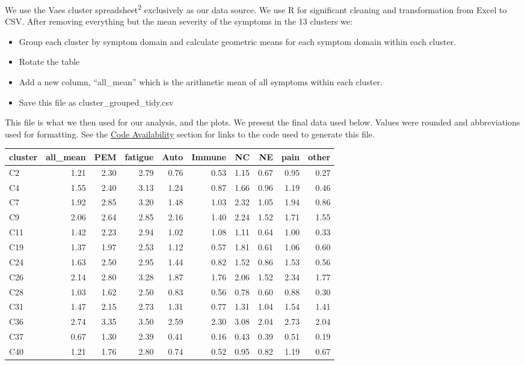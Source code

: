 \documentclass[
  letterpaper,
  DIV=11,
  numbers=noendperiod]{scrartcl}
\providecommand{\tightlist}{%
  \setlength{\itemsep}{0pt}\setlength{\parskip}{0pt}}
\begin{document}
We use the Vaes cluster spreadsheet\textsuperscript{2} exclusively as
our data source. We use R for significant cleaning and transformation
from Excel to CSV. After removing everything but the mean severity of
the symptoms in the 13 clusters we:

\begin{itemize}
\tightlist
\item
  Group each cluster by symptom domain and calculate geometric means for
  each symptom domain within each cluster.
\item
  Rotate the table
\item
  Add a new column, ``all\_mean'' which is the arithmetic mean of all
  symptoms within each cluster.
\item
  Save this file as cluster\_grouped\_tidy.csv
\end{itemize}

This file is what we then used for our analysis, and the plots. We
present the final data used below. Values were rounded and abbreviations
used for formatting. See the \hyperref[sec-code]{Code Availability}
section for links to the code used to generate this file.

\begin{table}
\fontsize{12.0pt}{14.4pt}\selectfont
\begin{tabular*}{\linewidth}{@{\extracolsep{\fill}}lrrrrrrrrr}
\toprule
cluster & all\_mean & PEM & fatigue & Auto & Immune & NC & NE & pain & other \\ 
\midrule\addlinespace[2.5pt]
C2 & 1.21 & 2.30 & 2.79 & 0.76 & 0.53 & 1.15 & 0.67 & 0.95 & 0.27 \\ 
C4 & 1.55 & 2.40 & 3.13 & 1.24 & 0.87 & 1.66 & 0.96 & 1.19 & 0.46 \\ 
C7 & 1.92 & 2.85 & 3.20 & 1.48 & 1.03 & 2.32 & 1.05 & 1.94 & 0.86 \\ 
C9 & 2.06 & 2.64 & 2.85 & 2.16 & 1.40 & 2.24 & 1.52 & 1.71 & 1.55 \\ 
C11 & 1.42 & 2.23 & 2.94 & 1.02 & 1.08 & 1.11 & 0.64 & 1.00 & 0.33 \\ 
C19 & 1.37 & 1.97 & 2.53 & 1.12 & 0.57 & 1.81 & 0.61 & 1.06 & 0.60 \\ 
C24 & 1.63 & 2.50 & 2.95 & 1.44 & 0.82 & 1.52 & 0.86 & 1.53 & 0.56 \\ 
C26 & 2.14 & 2.80 & 3.28 & 1.87 & 1.76 & 2.06 & 1.52 & 2.34 & 1.77 \\ 
C28 & 1.03 & 1.62 & 2.50 & 0.83 & 0.56 & 0.78 & 0.60 & 0.88 & 0.30 \\ 
C31 & 1.47 & 2.15 & 2.73 & 1.31 & 0.77 & 1.31 & 1.04 & 1.54 & 1.41 \\ 
C36 & 2.74 & 3.35 & 3.50 & 2.59 & 2.30 & 3.08 & 2.04 & 2.73 & 2.04 \\ 
C37 & 0.67 & 1.30 & 2.39 & 0.41 & 0.16 & 0.43 & 0.39 & 0.51 & 0.19 \\ 
C40 & 1.21 & 1.76 & 2.80 & 0.74 & 0.52 & 0.95 & 0.82 & 1.19 & 0.67 \\ 
\bottomrule
\end{tabular*}
\end{table}
\end{document}
